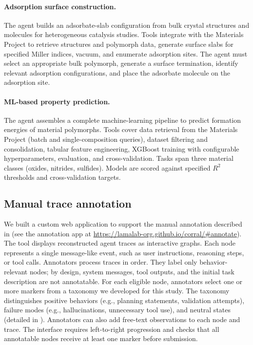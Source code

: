 \paragraph{Adsorption surface construction.}
The agent builds an adsorbate-slab configuration from bulk crystal structures and molecules for heterogeneous catalysis studies. Tools integrate with the Materials Project to retrieve structures and polymorph data, generate surface slabs for specified Miller indices, vacuum, and enumerate adsorption sites. The agent must select an appropriate bulk polymorph, generate a surface termination, identify relevant adsorption configurations, and place the adsorbate molecule on the adsorption site. 
 
\paragraph{ML-based property prediction.}
The agent assembles a complete machine-learning pipeline to predict formation energies of material polymorphs. Tools cover data retrieval from the Materials Project (batch and single-composition queries), dataset filtering and consolidation, tabular feature engineering, XGBoost  \autocite{chen2016xgboost} training with configurable hyperparameters, evaluation, and cross-validation. Tasks span three material classes (oxides, nitrides, sulfides). Models are scored against specified $R^{2}$ thresholds and cross-validation targets.
 
\subsection{Manual trace annotation}

We built a custom web application to support the manual annotation described in  (see the annotation app at \url{https://lamalab-org.github.io/corral/#annotate}). The tool displays reconstructed agent traces as interactive graphs. Each node represents a single message-like event, such as user instructions, reasoning steps, or tool calls. Annotators process traces in order. They label only behavior-relevant nodes; by design, system messages, tool outputs, and the initial task description are not annotatable. For each eligible node, annotators select one or more markers from a taxonomy we developed for this study. The taxonomy distinguishes positive behaviors (e.g., planning statements, validation attempts), failure modes (e.g., hallucinations, unnecessary tool use), and neutral states (detailed in ). Annotators can also add free-text observations to each node and trace. The interface requires left-to-right progression and checks that all annotatable nodes receive at least one marker before submission.

